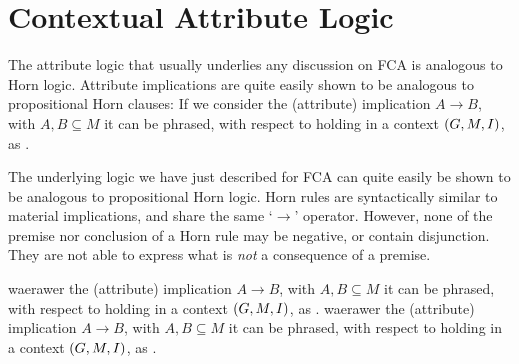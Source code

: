 \section{Contextual Attribute Logic}
\label{section:contextual-attribute-logic}

The attribute logic that usually underlies any discussion on FCA is analogous to
Horn logic. Attribute implications are quite easily shown to be analogous to
propositional Horn clauses: If we consider the (attribute) implication $A \rightarrow
B$, with $A, B \subseteq M$ it can be phrased, with respect to holding in a context
$(G,M,\mathrel{I})$, as .

The underlying logic we have just described for FCA can quite easily be shown to
be analogous to propositional Horn logic. Horn rules are syntactically similar
to material implications, and share the same `$\rightarrow$' operator. However, none
of the premise nor conclusion of a Horn rule may be negative, or contain
disjunction. They are not able to express what is \textit{not} a consequence of
a premise.

waerawer the (attribute) implication $A \rightarrow B$, with $A, B \subseteq M$ it
can be phrased, with respect to holding in a context $(G,M,\mathrel{I})$, as .
waerawer the (attribute) implication $A \rightarrow B$, with $A, B \subseteq M$
it can be phrased, with respect to holding in a context $(G,M,\mathrel{I})$, as .



